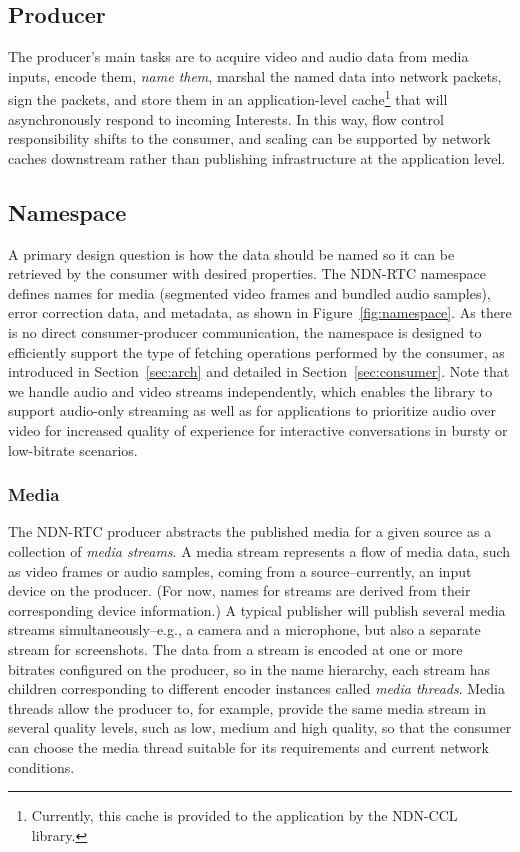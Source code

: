 \documentclass{icn/sig-alternate-2013} %
\newcommand{\ndnrtcName}{NDN-RTC} %
\begin{document}
\subsection{Producer}
The producer's main tasks are to acquire video and audio data from media inputs, encode them, \textit{name them}, marshal the named data into network packets, sign the packets, and store them in an application-level cache\footnote{Currently, this cache is provided to the application by the NDN-CCL library.} that will asynchronously respond to incoming Interests. In this way, flow control responsibility shifts to the consumer, and scaling can be supported by network caches downstream rather than publishing infrastructure at the application level.  

\subsection{Namespace}

A primary design question is how the data should be named so it can be retrieved by the consumer with desired properties. The \ndnrtcName{} namespace defines names for media (segmented video frames and bundled audio samples), error correction data, and metadata, as shown in Figure~\ref{fig:namespace}.  As there is no direct consumer-producer communication, the namespace is designed to efficiently support the type of fetching operations performed by the consumer, as introduced in Section~\ref{sec:arch} and detailed in Section~\ref{sec:consumer}.   Note that we handle audio and video streams independently, which enables the library to support audio-only streaming as well as for applications to prioritize audio over video for increased quality of experience for interactive conversations in bursty or low-bitrate scenarios.  

\subsubsection{Media} 

The \ndnrtcName{} producer abstracts the published media for a given source as a collection of \textit{media streams}. A media stream represents a flow of media data, such as video frames or audio samples, coming from a source--currently, an input device on the producer. (For now, names for streams are derived from their corresponding device information.) A typical publisher will publish several media streams simultaneously--e.g., a camera and a microphone, but also a separate stream for screenshots.  The data from a stream is encoded at one or more bitrates configured on the producer, so in the name hierarchy, each stream has children corresponding to different encoder instances called \textit{media threads}. Media threads allow the producer to, for example, provide the same media stream in several quality levels, such as low, medium and high quality, so that the consumer can choose the media thread suitable for its requirements and current network conditions.
\end{document}
